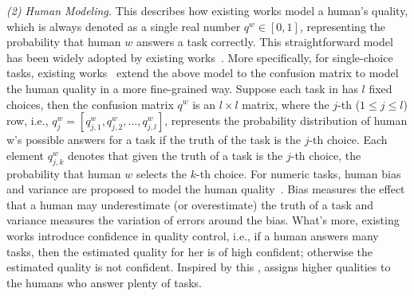 \textit{(2) Human Modeling.} This  describes how existing works model a human's quality, which is always denoted as a single real number $q^w \in [0,1]$, representing the probability that human $w$ answers a task correctly. This straightforward model has been widely adopted by existing works~\cite{DBLP:conf/nips/LiuPI12, DBLP:zencrowd, DBLP:conf/aaai/AydinYLLGD14}. More specifically, for single-choice tasks, existing works~\cite{DBLP:conf/www/VenanziGKKS14, DBLP:journals/jmlr/KimG12, raykar2010learning} extend the above model to the confusion matrix to model the human quality in a more fine-grained way. Suppose each task in  has $l$ fixed choices, then the confusion matrix $q^w$ is an $l × l$ matrix, where  the $j$-th ($1 \leq j \leq l$) row, i.e., $q^w_j = [ q^w_{j,1},q^w_{j,2},...,q^w_{j,l} ]$, represents the probability distribution of human w’s possible answers for a task if the truth of the task is the $j$-th choice. Each element $q^w_{j,k}$  denotes that given the truth of a task is the $j$-th choice, the probability that human $w$ selects the $k$-th choice. For numeric tasks, human bias and variance are proposed to model the human quality~\cite{raykar2010learning, welinder2010multidimensional}. Bias measures the effect that a human may underestimate (or overestimate) the truth of a task and variance measures the variation of errors around the bias. 
What's more, existing works \cite{DBLP:conf/kdd/JoglekarGP13, DBLP:journals/pvldb/LiLGSZDFH14} introduce confidence in quality control, i.e.,  if a human answers many
tasks, then the estimated quality for her is of high confident; otherwise the estimated quality is not confident. Inspired by this
, \cite{DBLP:journals/pvldb/LiLGSZDFH14} assigns higher qualities to the humans who answer plenty of tasks. 


